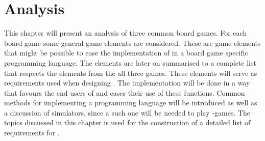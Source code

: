 \chapter{Analysis}
This chapter will present an analysis of three common board games. For each board game some general game elements are considered. These are game elements that might be possible to ease the implementation of in a board game specific programming language. The elements are later on summarised to a complete list that respects the elements from the all three games. These elements will serve as requirements used when designing \productname{}. The implementation will be done in a way that favours the end users of \productname{} and eases their use of these functions. Common methods for implementing a programming language will be introduced as well as a discussion of simulators, since a such one will be needed to play \productname{}-games. The topics discussed in this chapter is used for the construction of a detailed list of requirements for \productname{}.









%




